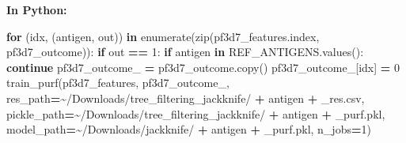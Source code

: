 \documentclass[
  11pt,
  oneside]{book}
\newenvironment{Shaded}{\begin{snugshade}}{\end{snugshade}}
\newcommand{\BuiltInTok}[1]{#1}
\newcommand{\ControlFlowTok}[1]{\textcolor[rgb]{0.13,0.29,0.53}{\textbf{#1}}}
\newcommand{\DecValTok}[1]{\textcolor[rgb]{0.00,0.00,0.81}{#1}}
\newcommand{\KeywordTok}[1]{\textcolor[rgb]{0.13,0.29,0.53}{\textbf{#1}}}
\newcommand{\NormalTok}[1]{#1}
\newcommand{\OperatorTok}[1]{\textcolor[rgb]{0.81,0.36,0.00}{\textbf{#1}}}
\newcommand{\StringTok}[1]{\textcolor[rgb]{0.31,0.60,0.02}{#1}}
\begin{document}
\textbf{In Python: }

\begin{Shaded}
\begin{Highlighting}[]
\ControlFlowTok{for}\NormalTok{ (idx, (antigen, out)) }\KeywordTok{in} \BuiltInTok{enumerate}\NormalTok{(}\BuiltInTok{zip}\NormalTok{(pf3d7\_features.index, pf3d7\_outcome)):}
    \ControlFlowTok{if}\NormalTok{ out }\OperatorTok{==} \DecValTok{1}\NormalTok{:}
        \ControlFlowTok{if}\NormalTok{ antigen }\KeywordTok{in}\NormalTok{ REF\_ANTIGENS.values():}
            \ControlFlowTok{continue}
\NormalTok{        pf3d7\_outcome\_ }\OperatorTok{=}\NormalTok{ pf3d7\_outcome.copy()}
\NormalTok{        pf3d7\_outcome\_[idx] }\OperatorTok{=} \DecValTok{0}
\NormalTok{        train\_purf(pf3d7\_features, pf3d7\_outcome\_,}
\NormalTok{                   res\_path}\OperatorTok{=}\StringTok{\textquotesingle{}\textasciitilde{}/Downloads/tree\_filtering\_jackknife/\textquotesingle{}} \OperatorTok{+}\NormalTok{ antigen }\OperatorTok{+} \StringTok{\textquotesingle{}\_res.csv\textquotesingle{}}\NormalTok{,}
\NormalTok{                   pickle\_path}\OperatorTok{=}\StringTok{\textquotesingle{}\textasciitilde{}/Downloads/tree\_filtering\_jackknife/\textquotesingle{}} \OperatorTok{+}\NormalTok{ antigen }\OperatorTok{+} \StringTok{\textquotesingle{}\_purf.pkl\textquotesingle{}}\NormalTok{,}
\NormalTok{                   model\_path}\OperatorTok{=}\StringTok{\textquotesingle{}\textasciitilde{}/Downloads/jackknife/\textquotesingle{}} \OperatorTok{+}\NormalTok{ antigen }\OperatorTok{+} \StringTok{\textquotesingle{}\_purf.pkl\textquotesingle{}}\NormalTok{,}
\NormalTok{                   n\_jobs}\OperatorTok{=}\DecValTok{1}\NormalTok{)}
\end{Highlighting}
\end{Shaded}
\end{document}
